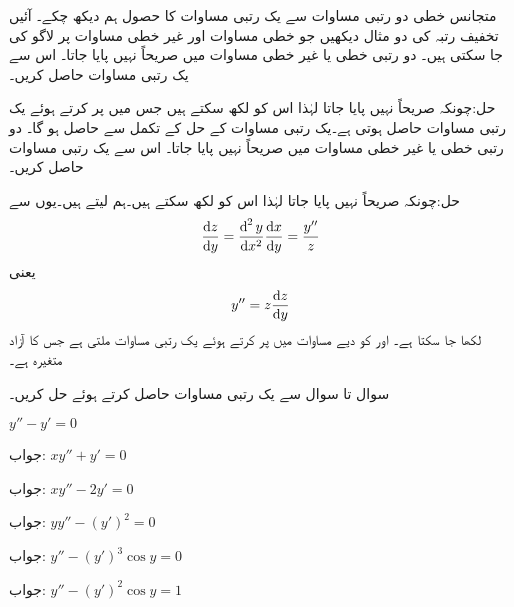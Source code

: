 متجانس خطی دو رتبی مساوات سے یک رتبی مساوات کا حصول ہم دیکھ چکے۔ آئیں تخفیف رتبہ کی دو مثال دیکھیں جو خطی مساوات اور غیر خطی مساوات پر لاگو کی جا سکتی ہیں۔
دو رتبی خطی یا غیر خطی مساوات  میں  صریحاً نہیں پایا جاتا۔ اس سے یک رتبی مساوات حاصل کریں۔

حل:چونکہ  صریحاً نہیں پایا جاتا لہٰذا اس کو  لکھ سکتے ہیں جس میں  پر کرتے ہوئے یک رتبی مساوات  حاصل ہوتی ہے۔یک رتبی مساوات کے حل کے تکمل سے  حاصل ہو گا۔
دو رتبی خطی یا غیر خطی مساوات  میں  صریحاً نہیں پایا جاتا۔ اس سے یک رتبی مساوات حاصل کریں۔

حل:چونکہ  صریحاً نہیں پایا جاتا لہٰذا اس کو  لکھ سکتے ہیں۔ہم  لیتے ہیں۔یوں  سے
\begin{align*}
\frac{\dif z}{\dif y}=\frac{\dif^{\,2} y}{\dif x^2} \frac{\dif x}{\dif y}=\frac{y''}{z}
\end{align*}
یعنی
\begin{align*}
y''=z\frac{\dif z}{\dif y}
\end{align*}
لکھا جا سکتا ہے۔ اور  کو دیے مساوات میں پر کرتے ہوئے یک رتبی مساوات  ملتی ہے جس کا آزاد متغیرہ  ہے۔

 \quad سوال  تا سوال  سے یک رتبی مساوات حاصل کرتے ہوئے حل کریں۔

$y''-y'=0$

جواب:
$xy''+y'=0$

جواب:
$xy''-2y'=0$

جواب:
$yy''-(y')^2=0$

جواب:
$y''-(y')^3 \cos y=0$

جواب:
$y''-(y')^2 \cos y=1$

